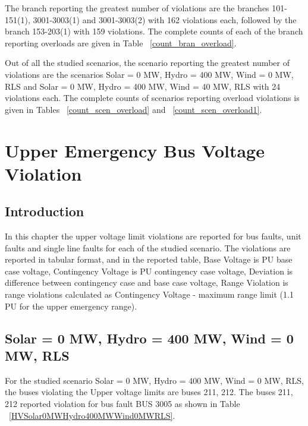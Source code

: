 \documentclass[10pt]{report}
\begin{document}
The branch reporting the greatest number of violations are the branches 101-151(1), 3001-3003(1) and 3001-3003(2) with 162 violations each, followed by the branch 153-203(1) with 159 violations. The complete counts of each of the branch reporting overloads are given in Table ~\ref{count_bran_overload}.

Out of all the studied scenarios, the scenario reporting the greatest number of violations are the scenarios Solar = 0 MW, Hydro = 400 MW, Wind = 0 MW, RLS and Solar = 0 MW, Hydro = 400 MW, Wind = 40 MW, RLS with 24 violations each. The complete counts of scenarios reporting overload violations is given in Tables ~\ref {count_scen_overload} and ~\ref {count_scen_overload1}.  



\chapter{Upper Emergency Bus Voltage Violation}
\label{upper}
\section{Introduction}
In this chapter the upper voltage limit violations are reported for bus faults, unit faults and single line faults for each of the studied scenario.
The violations are reported in tabular format, and in the reported table, Base Voltage is PU base case voltage, Contingency Voltage is PU contingency case voltage, Deviation is difference between contingency case and base case voltage, Range Violation is range violations calculated as Contingency Voltage - maximum range limit (1.1 PU for the upper emergency range).
\section{Solar = 0 MW, Hydro = 400 MW, Wind = 0 MW, RLS}
For the studied scenario Solar = 0 MW, Hydro = 400 MW, Wind = 0 MW, RLS, the buses violating the Upper voltage limits are buses 211, 212.
The buses 211, 212 reported violation for bus fault BUS 3005 as shown in Table ~\ref{HVSolar0MWHydro400MWWind0MWRLS}.
\begin{table}[H]
\caption{Contingencies reporting bus voltages greater than emergency voltage of 1.1 PU for scenario Solar = 0 MW, Hydro = 400 MW, Wind = 0 MW, RLS}
\label{HVSolar0MWHydro400MWWind0MWRLS}
\centering
{}
\end{table}
\end{document}
